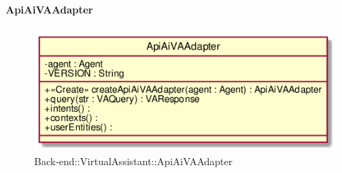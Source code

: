 \hypertarget{ApiAiVAAdapter_label}{\paragraph{ApiAiVAAdapter}}
\begin{figure}[h]
	\centering
	\includegraphics[width=\textwidth,height=\textheight,keepaspectratio]{images/ClassApiAiVAAdapter.png}
	\caption{Back-end::VirtualAssistant::ApiAiVAAdapter}
\end{figure}
